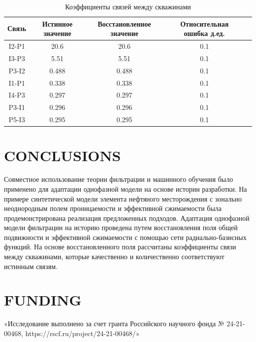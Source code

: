 \documentclass{article}
\begin{document}
	\begin{table}[h!]
	\caption{Коэффициенты связей между скважинами}	
	\label{tabl:connection}	
	\begin{center}
		\begin{tabular}{c|c|c|c|c}
			\hline
			Связь & Истинное значение & Восстановленное значение & Относительная ошибка д.ед. \\
			\hline
				I2-P1 & 20.6 & 20.6 & 0.1 \\ 
				I3-P3 & 5.51 & 5.51 & 0.1 \\ 
				P3-I2 & 0.488 & 0.488 & 0.1 \\ 
				I1-P1 & 0.338 & 0.338 & 0.1 \\ 
				I4-P3 & 0.297 & 0.297 & 0.1 \\ 
				P3-I1 & 0.296 & 0.296 & 0.1 \\ 
				P5-I3 & 0.295 & 0.295 & 0.1 \\ 
			\hline
			
		\end{tabular}
	\end{center}
\end{table}


\section{CONCLUSIONS}

Совместное использование теории фильтрации и машинного обучения было применено для адаптации однофазной модели на основе истории разработки. На примере синтетической модели элемента нефтяного месторождения с зонально неоднородным полем проницаемости и эффективной сжимаемости была продемонстрирована реализация предложенных подходов.
Адаптация однофазной модели фильтрации на историю проведена путем восстановления поля общей подвижности и эффективной сжимаемости с помощью сети радиально-базисных функций. На основе восстановленного поля рассчитаны коэффициенты связи между скважинами, которые качественно и количественно соответствуют истинным связям.

\section{FUNDING}
«Исследование выполнено за счет гранта Российского научного фонда № 24-21-00468,
 https://rscf.ru/project/24-21-00468/»
\end{document}
